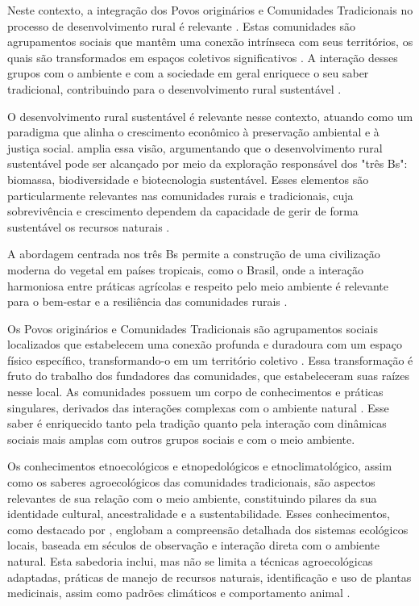 Neste contexto, a integração dos Povos originários e Comunidades Tradicionais no processo de desenvolvimento rural é relevante \cite{Abramovay2020}. Estas comunidades são agrupamentos sociais que mantêm uma conexão intrínseca com seus territórios, os quais são transformados em espaços coletivos significativos \cite{Kovaleva2021}. A interação desses grupos com o ambiente e com a sociedade em geral enriquece o seu saber tradicional, contribuindo para o desenvolvimento rural sustentável \cite{Montanari2020}.

O desenvolvimento rural sustentável é relevante nesse contexto, atuando como um paradigma que alinha o crescimento econômico à preservação ambiental e à justiça social.  amplia essa visão, argumentando que o desenvolvimento rural sustentável pode ser alcançado por meio da exploração responsável dos "três Bs": biomassa, biodiversidade e biotecnologia sustentável. Esses elementos são particularmente relevantes nas comunidades rurais e tradicionais, cuja sobrevivência e crescimento dependem da capacidade de gerir de forma sustentável os recursos naturais \cite{Tagliapietra2021}.

A abordagem centrada nos três Bs permite a construção de uma civilização moderna do vegetal em países tropicais, como o Brasil, onde a interação harmoniosa entre práticas agrícolas e respeito pelo meio ambiente é relevante para o bem-estar e a resiliência das comunidades rurais \cite{Sachs1993}.

Os Povos originários e Comunidades Tradicionais são agrupamentos sociais localizados que estabelecem uma conexão profunda e duradoura com um espaço físico específico, transformando-o em um território coletivo \cite{Grant2020}. Essa transformação é fruto do trabalho dos fundadores das comunidades, que estabeleceram suas raízes nesse local. As comunidades possuem um corpo de conhecimentos e práticas singulares, derivados das interações complexas com o ambiente natural \cite{Clayton2019}. Esse saber é enriquecido tanto pela tradição quanto pela interação com dinâmicas sociais mais amplas com outros grupos sociais e com o meio ambiente.

Os conhecimentos etnoecológicos e etnopedológicos e etnoclimatológico, assim como os saberes agroecológicos das comunidades tradicionais, são aspectos relevantes de sua relação com o meio ambiente, constituindo pilares da sua identidade cultural, ancestralidade e a sustentabilidade. Esses conhecimentos, como destacado por , englobam a compreensão detalhada dos sistemas ecológicos locais, baseada em séculos de observação e interação direta com o ambiente natural. Esta sabedoria inclui, mas não se limita a técnicas agroecológicas adaptadas, práticas de manejo de recursos naturais, identificação e uso de plantas medicinais, assim como padrões climáticos e comportamento animal \cite{Ahad2023}.

